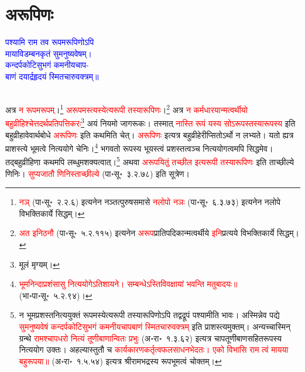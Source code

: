 \section[अरूपिणः]{अरूपिणः}
\centering\textcolor{blue}{पश्यामि राम तव रूपमरूपिणोऽपि\nopagebreak\\
मायाविडम्बनकृतं सुमनुष्यवेषम्।\nopagebreak\\
कन्दर्पकोटिसुभगं कमनीयचाप-\nopagebreak\\
बाणं दयार्द्रहृदयं स्मितचारुवक्त्रम्॥}\nopagebreak\\
\\
\begin{sloppypar}\justifying\noindent\hspace{10mm} अत्र \textcolor{red}{न रूपमरूपम्}।\footnote{\textcolor{red}{नञ्‌} (पा॰सू॰~२.२.६) इत्यनेन नञ्तत्पुरुष\-समासे \textcolor{red}{नलोपो नञः} (पा॰सू॰~६.३.७३) इत्यनेन नलोपे विभक्तिकार्ये सिद्धम्।} \textcolor{red}{अरूपमस्त्यस्येत्यरूपी तस्यारूपिणः}।\footnote{\textcolor{red}{अत इनिठनौ} (पा॰सू॰~५.२.११५) इत्यनेन \textcolor{red}{अरूप}\-प्रातिपदिकान्मत्वर्थीये \textcolor{red}{इनि}प्रत्यये विभक्तिकार्ये सिद्धम्।} अत्र \textcolor{red}{न कर्मधारयान्मत्वर्थीयो बहुव्रीहिश्चेत्तदर्थ\-प्रतिपत्ति\-करः}\footnote{मूलं मृग्यम्।} अयं नियमो जागरूकः। तस्मात् \textcolor{red}{नास्ति रूपं यस्य सोऽरूपस्तस्यारूपस्य} इति बहुव्रीहावेवार्थ\-बोधे \textcolor{red}{अरूपिणः} इति कथमिति चेत्। \textcolor{red}{अरूपिणः} इत्यत्र बहुव्रीहेरीप्सितोऽर्थो न लभ्यते। यतो ह्यत्र प्राशस्त्ये भूमत्वे नित्ययोगे चेनिः।\footnote{\textcolor{red}{भूम\-निन्दा\-प्रशंसासु नित्ययोगेऽति\-शायने। सम्बन्धेऽस्ति\-विवक्षायां भवन्ति मतुबादयः॥} (भा॰पा॰सू॰~५.२.९४)।} भगवतो रूपस्य भूयस्त्वं प्रशस्तत्वञ्च नित्य\-योगत्वमपि सिद्धमेव। तद्बहुव्रीहिणा कथमपि लब्धुमशक्यत्वात्।\footnote{न भूम\-प्रशस्त\-नित्ययुक्तं रूपमस्येत्यरूपी तस्यारूपिणोऽपि तद्वद्रूपं पश्यामीति भावः। अस्मिन्नेव पद्ये \textcolor{red}{सुमनुष्य\-वेषं कन्दर्प\-कोटि\-सुभगं कमनीय\-चाप\-बाणं स्मित\-चारुवक्त्रम्} इति प्राशस्त्यमुक्तम्। अन्यच्चास्मिन् ग्रन्थे \textcolor{red}{रामश्चापधरो नित्यं तूणीबाणान्वितः प्रभुः} (अ॰रा॰~१.३.६२) इत्यत्र चाप\-तूणी\-बाण\-सहित\-रूपस्य नित्ययोग उक्तः। अहल्या\-स्तुतौ च \textcolor{red}{कार्य\-कारण\-कर्तृत्व\-फल\-साधन\-भेदतः। एको विभासि राम त्वं मायया बहुरूपया॥} (अ॰रा॰~१.५.५४) इत्यत्र श्रीरामभद्रस्य रूपभूमत्वं चोक्तम्।} अथवा \textcolor{red}{अरूपयितुं तच्छील इत्यरूपी तस्यारूपिणः} इति ताच्छील्ये णिनिः। \textcolor{red}{सुप्यजातौ णिनिस्ताच्छील्ये} (पा॰सू॰~३.२.७८) इति सूत्रेण।\end{sloppypar}
